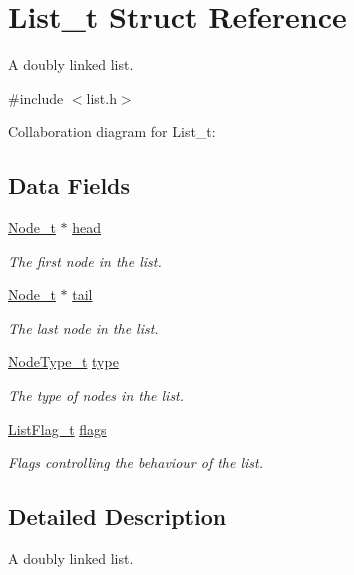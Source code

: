 \hypertarget{structList__t}{\section{List\+\_\+t Struct Reference}
\label{structList__t}
}


A doubly linked list.  




{\ttfamily \#include $<$list.\+h$>$}



Collaboration diagram for List\+\_\+t\+:
\subsection*{Data Fields}
\begin{DoxyCompactItemize}
\item 
\hyperlink{structNode__t}{Node\+\_\+t} $\ast$ \hyperlink{structList__t_a4cd0a86bd26d4f568bcf2706a7a5af12}{head}
\begin{DoxyCompactList}\small\item\em The first node in the list. \end{DoxyCompactList}\item 
\hyperlink{structNode__t}{Node\+\_\+t} $\ast$ \hyperlink{structList__t_a62a0961fe562cfb46a057cc59a3acb80}{tail}
\begin{DoxyCompactList}\small\item\em The last node in the list. \end{DoxyCompactList}\item 
\hyperlink{list_8h_aff499c00c9873bf3fcf1c46bf2652790}{Node\+Type\+\_\+t} \hyperlink{structList__t_ad61b5ec1119556c7ef7f11971ac3f627}{type}
\begin{DoxyCompactList}\small\item\em The type of nodes in the list. \end{DoxyCompactList}\item 
\hyperlink{list_8h_aa62abdd0ceb352bfba2ef60264a016db}{List\+Flag\+\_\+t} \hyperlink{structList__t_ae857c80ff9476653e6f79af7a600754c}{flags}
\begin{DoxyCompactList}\small\item\em Flags controlling the behaviour of the list. \end{DoxyCompactList}\end{DoxyCompactItemize}


\subsection{Detailed Description}
A doubly linked list. 

